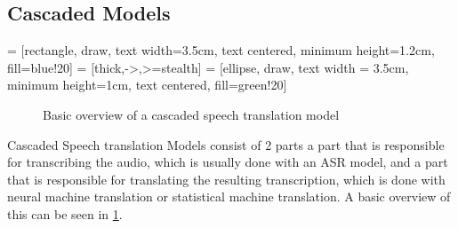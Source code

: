 
\subsection{Cascaded Models}
 = [rectangle, draw, text width=3.5cm, text centered, minimum height=1.2cm, fill=blue!20]
 = [thick,->,>=stealth]
 = [ellipse, draw, text width = 3.5cm, minimum height=1cm, text centered, fill=green!20]

\begin{figure}
    \centering
\caption{Basic overview of a cascaded speech translation model}
\label{fig:cascadedmodel}
\end{figure}
Cascaded Speech translation Models consist of 2 parts a part that is responsible for transcribing the audio, which is usually done with an ASR model, and a part that is responsible for translating the resulting transcription, which is done with neural machine translation or statistical machine translation. A basic overview of this can be seen in \ref{fig:cascadedmodel}.

